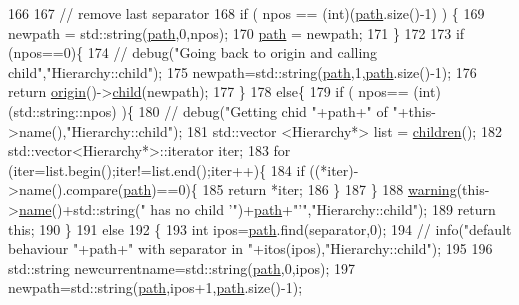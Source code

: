 \begin{DoxyCode}
166 
167   \textcolor{comment}{// remove last separator}
168   \textcolor{keywordflow}{if} ( npos == (\textcolor{keywordtype}{int})(\hyperlink{classHierarchy_aa7990fa7caf132d83e361ce033c6c65a}{path}.size()-1) ) \{
169     newpath = std::string(\hyperlink{classHierarchy_aa7990fa7caf132d83e361ce033c6c65a}{path},0,npos);
170     \hyperlink{classHierarchy_aa7990fa7caf132d83e361ce033c6c65a}{path} = newpath;
171   \}
172 
173   \textcolor{keywordflow}{if} (npos==0)\{
174     \textcolor{comment}{//    debug("Going back to origin and calling child","Hierarchy::child");}
175     newpath=std::string(\hyperlink{classHierarchy_aa7990fa7caf132d83e361ce033c6c65a}{path},1,\hyperlink{classHierarchy_aa7990fa7caf132d83e361ce033c6c65a}{path}.size()-1);
176     \textcolor{keywordflow}{return} \hyperlink{classHierarchy_aee461dc930ce3871636ff87f075b1b83}{origin}()->\hyperlink{classHierarchy_a1e207f973c694b538bf90107b4868817}{child}(newpath);
177   \}
178   \textcolor{keywordflow}{else}\{
179     \textcolor{keywordflow}{if} ( npos== (\textcolor{keywordtype}{int})(std::string::npos) )\{
180       \textcolor{comment}{//      debug("Getting chid "+path+" of "+this->name(),"Hierarchy::child");}
181       std::vector <Hierarchy*> list = \hyperlink{classHierarchy_aa9a76f69e98e052ee1a6e32cea006288}{children}();
182       std::vector<Hierarchy*>::iterator iter;
183       \textcolor{keywordflow}{for} (iter=list.begin();iter!=list.end();iter++)\{
184         \textcolor{keywordflow}{if} ((*iter)->name().compare(\hyperlink{classHierarchy_aa7990fa7caf132d83e361ce033c6c65a}{path})==0)\{
185           \textcolor{keywordflow}{return} *iter;
186         \}
187       \}
188       \hyperlink{classObject_a65cd4fda577711660821fd2cd5a3b4c9}{warning}(this->\hyperlink{classObject_a300f4c05dd468c7bb8b3c968868443c1}{name}()+std::string(\textcolor{stringliteral}{" has no child '"})+\hyperlink{classHierarchy_aa7990fa7caf132d83e361ce033c6c65a}{path}+\textcolor{stringliteral}{"'"},\textcolor{stringliteral}{"Hierarchy::child"});
189       \textcolor{keywordflow}{return} \textcolor{keyword}{this};
190     \}
191     \textcolor{keywordflow}{else}
192     \{
193       \textcolor{keywordtype}{int} ipos=\hyperlink{classHierarchy_aa7990fa7caf132d83e361ce033c6c65a}{path}.find(separator,0);
194       \textcolor{comment}{//      info("default behaviour "+path+" with separator in "+itos(ipos),"Hierarchy::child");}
195 
196       std::string newcurrentname=std::string(\hyperlink{classHierarchy_aa7990fa7caf132d83e361ce033c6c65a}{path},0,ipos);
197       newpath=std::string(\hyperlink{classHierarchy_aa7990fa7caf132d83e361ce033c6c65a}{path},ipos+1,\hyperlink{classHierarchy_aa7990fa7caf132d83e361ce033c6c65a}{path}.size()-1);

\end{DoxyCode}
